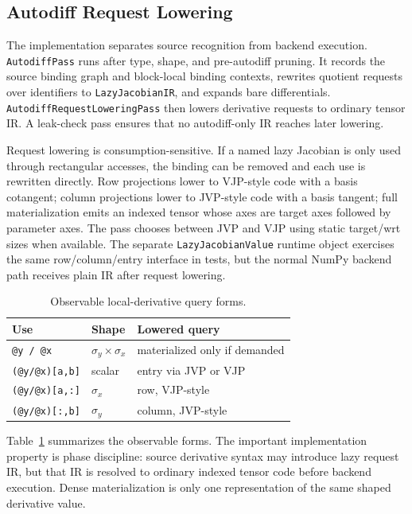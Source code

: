 \documentclass[sigplan,screen,nonacm]{acmart}
\begin{document}
\subsection{Autodiff Request Lowering}

The implementation separates source recognition from backend execution. \texttt{AutodiffPass} runs after type, shape, and pre-autodiff pruning. It records the source binding graph and block-local binding contexts, rewrites quotient requests over identifiers to \texttt{LazyJacobianIR}, and expands bare differentials. \texttt{AutodiffRequestLoweringPass} then lowers derivative requests to ordinary tensor IR. A leak-check pass ensures that no autodiff-only IR reaches later lowering.

Request lowering is consumption-sensitive. If a named lazy Jacobian is only used through rectangular accesses, the binding can be removed and each use is rewritten directly. Row projections lower to VJP-style code with a basis cotangent; column projections lower to JVP-style code with a basis tangent; full materialization emits an indexed tensor whose axes are target axes followed by parameter axes. The pass chooses between JVP and VJP using static target/wrt sizes when available. The separate \texttt{LazyJacobianValue} runtime object exercises the same row/column/entry interface in tests, but the normal NumPy backend path receives plain IR after request lowering.

\begin{table}[t]
\centering
\caption{Observable local-derivative query forms.}
\label{tab:derivative-queries}
\renewcommand{\arraystretch}{1.08}
\small
\setlength{\tabcolsep}{4pt}
\begin{tabular}{@{}lll@{}}
\toprule
Use & Shape & Lowered query \\
\midrule
\texttt{@y / @x} & $\sigma_y \times \sigma_x$ & materialized only if demanded \\
\texttt{(@y/@x)[a,b]} & scalar & entry via JVP or VJP \\
\texttt{(@y/@x)[a,:]} & $\sigma_x$ & row, VJP-style \\
\texttt{(@y/@x)[:,b]} & $\sigma_y$ & column, JVP-style \\
\bottomrule
\end{tabular}
\end{table}

Table~\ref{tab:derivative-queries} summarizes the observable forms. The important implementation property is phase discipline: source derivative syntax may introduce lazy request IR, but that IR is resolved to ordinary indexed tensor code before backend execution. Dense materialization is only one representation of the same shaped derivative value.
\end{document}
